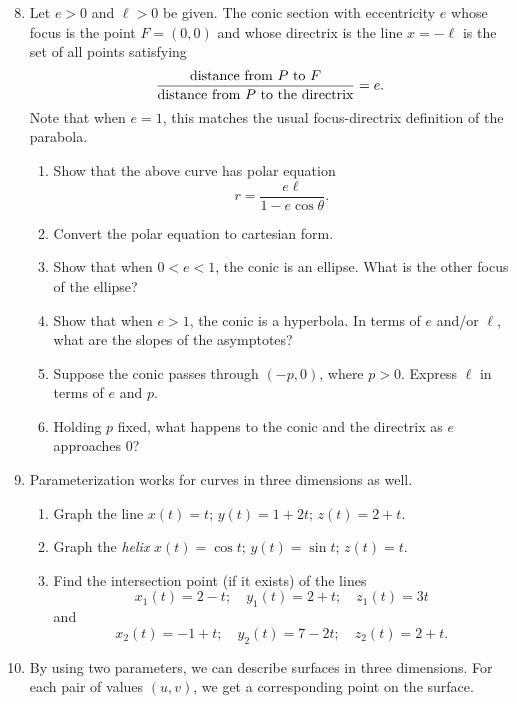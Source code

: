 \begin{enumerate}\setcounter{enumi}{7}
\item Let $e > 0$ and $\ell > 0$ be given. The conic section with eccentricity $e$ whose focus is the point $F = (0,0)$ and whose directrix is the line $x = -\ell$ is the set of all points satisfying
\begin{equation*}
\frac{\text{distance from \ensuremath{P} to \ensuremath{F}}}{\text{distance from \ensuremath{P} to the directrix}} = e.
\end{equation*}
Note that when $e = 1$, this matches the usual focus-directrix definition of the parabola.
\begin{enumerate}
\item Show that the above curve has polar equation
\begin{equation*}
r = \frac{e\ell}{1 - e\cos\theta}.
\end{equation*}
\item Convert the polar equation to cartesian form.
\item Show that when $0 < e < 1$, the conic is an ellipse. What is the other focus of the ellipse?
\item Show that when $e > 1$, the conic is a hyperbola. In terms of $e$ and/or $\ell$, what are the slopes of the asymptotes?
\item Suppose the conic passes through $(-p,0)$, where $p > 0$. Express $\ell$ in terms of $e$ and $p$.
\item Holding $p$ fixed, what happens to the conic and the directrix as $e$ approaches $0$?
\end{enumerate}\newpage
\item Parameterization works for curves in three dimensions as well.
\begin{enumerate}
\item Graph the line $x(t) = t$; $y(t) = 1 + 2t$; $z(t) = 2 + t$.
\item Graph the \emph{helix} $x(t) = \cos t$; $y(t) = \sin t$; $z(t) = t$.
\item Find the intersection point (if it exists) of the lines
\begin{equation*}
x_1(t) = 2 - t;\quad y_1(t) = 2 + t;\quad z_1(t) = 3t
\end{equation*}
and
\begin{equation*}
x_2(t) = -1 + t;\quad y_2(t) = 7 - 2t;\quad z_2(t) = 2 + t.
\end{equation*}
\end{enumerate}
\item By using two parameters, we can describe surfaces in three dimensions. For each pair of values $(u,v)$, we get a corresponding point on the surface.

\end{enumerate}
